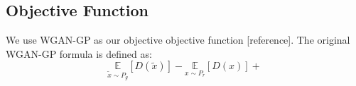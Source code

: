 \subsection{Objective Function}
We use WGAN-GP as our objective objective function [reference]. The original WGAN-GP formula is defined as:
\begin{equation}
\underset{\widetilde{x} \sim P_g}{\mathbb{E}}[D(\widetilde{x})] - \underset{x \sim P_r}{\mathbb{E}}[D(x)] + 
\end{equation}